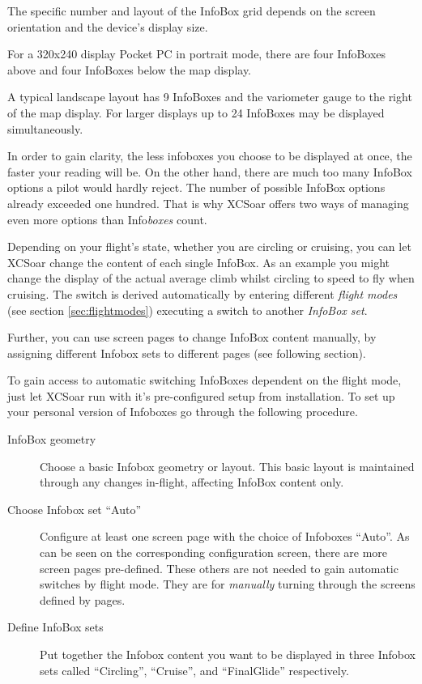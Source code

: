 The specific number and layout of the InfoBox grid depends on the
screen orientation and the device's display size.  

For a 320x240 display
Pocket PC in portrait mode, there are four InfoBoxes above and four
InfoBoxes below the map display.  

A typical landscape layout has 9 InfoBoxes and the variometer gauge 
to the right of the map display. 
For larger displays up to 24 InfoBoxes may be displayed simultaneously.  

In order to gain clarity, the less infoboxes you choose to be displayed at once, 
the faster your reading will be. On the other hand, there are much too many 
InfoBox options a pilot would hardly reject. The number of possible InfoBox 
options already exceeded one hundred. That is why XCSoar offers two ways of 
managing even more options than Info\emph{boxes} count.

Depending on your flight's state, whether you are circling or cruising, you can 
let XCSoar change the content of each single InfoBox. As an example you might 
change the display of the actual average climb whilst circling to speed to fly 
when cruising. The switch is derived automatically by entering different 
\emph{flight modes} (see section \ref{sec:flightmodes}) executing a switch to 
another \emph{InfoBox set}.

Further, you can use screen pages to change InfoBox content manually, by 
assigning different Infobox sets to different pages (see following section).

To gain access to automatic switching InfoBoxes dependent on the flight mode, 
just let XCSoar run with it's pre-configured setup from installation. To set up 
your personal version of Infoboxes go through the following procedure.
\begin{description}
\item[InfoBox geometry] Choose a basic Infobox geometry or layout.  This basic 
layout is maintained through any changes in-flight, affecting InfoBox content 
only.
\item[Choose Infobox set ``Auto''] Configure at least one screen page with the
choice of Infoboxes ``Auto''. As can be seen on the corresponding configuration
screen, there are more screen pages pre-defined.   These 
others are not needed to gain automatic switches by flight mode. They are for \emph{manually} turning through the screens defined by pages. 
\item[Define InfoBox sets] Put together the Infobox content you want to be 
displayed in three Infobox sets called ``Circling'', ``Cruise'', and ``FinalGlide''
respectively.
\end{description}  


